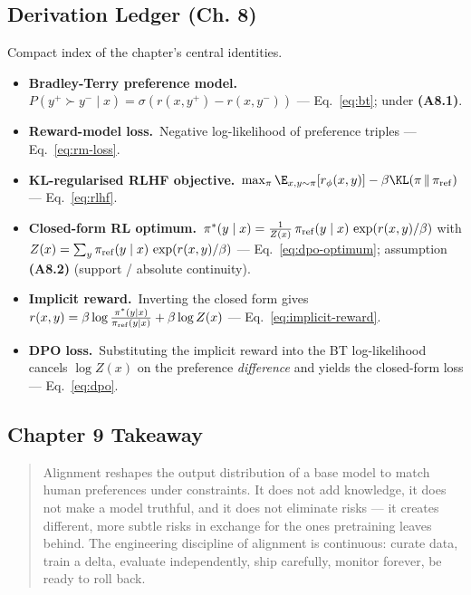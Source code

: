 \subsection*{Derivation Ledger (Ch. 8)}

\begin{derivledger}
Compact index of the chapter's central identities.
\begin{itemize}
  \item \textbf{Bradley-Terry preference model.}\
        $P(y^+ \succ y^- \mid x) = \sigma(r(x, y^+) - r(x, y^-))$
        --- Eq.~\eqref{eq:bt}; under \textbf{(A8.1)}.
  \item \textbf{Reward-model loss.}\
        Negative log-likelihood of preference triples
        --- Eq.~\eqref{eq:rm-loss}.
  \item \textbf{KL-regularised RLHF objective.}\
        $\max_\pi \E_{x, y \sim \pi}[r_\phi(x,y)] - \beta \KL(\pi \,\|\, \pi_{\rm ref})$
        --- Eq.~\eqref{eq:rlhf}.
  \item \textbf{Closed-form RL optimum.}\
        $\pi^*(y \mid x) = \frac{1}{Z(x)}\, \pi_{\rm ref}(y \mid x)\, \exp(r(x, y)/\beta)$
        with $Z(x) = \sum_y \pi_{\rm ref}(y \mid x)\, \exp(r(x, y)/\beta)$
        --- Eq.~\eqref{eq:dpo-optimum}; assumption \textbf{(A8.2)}
        (support / absolute continuity).
  \item \textbf{Implicit reward.}\
        Inverting the closed form gives
        $r(x, y) = \beta \log \frac{\pi^*(y \mid x)}{\pi_{\rm ref}(y \mid x)} + \beta \log Z(x)$
        --- Eq.~\eqref{eq:implicit-reward}.
  \item \textbf{DPO loss.}\
        Substituting the implicit reward into the BT log-likelihood
        cancels $\log Z(x)$ on the preference \emph{difference} and
        yields the closed-form loss
        --- Eq.~\eqref{eq:dpo}.
\end{itemize}
\end{derivledger}

\subsection{Chapter 9 Takeaway}

\begin{quote}
Alignment reshapes the output distribution of a base model to match
human preferences under constraints. It does not add knowledge, it
does not make a model truthful, and it does not eliminate risks ---
it creates different, more subtle risks in exchange for the ones
pretraining leaves behind. The engineering discipline of alignment
is continuous: curate data, train a delta, evaluate independently,
ship carefully, monitor forever, be ready to roll back.
\end{quote}
